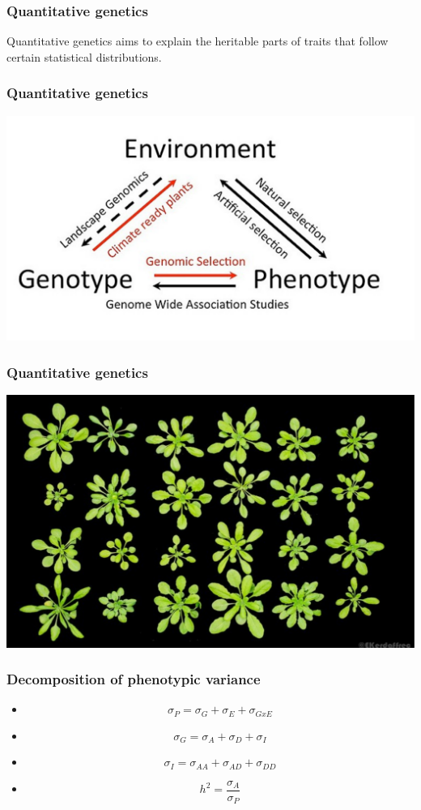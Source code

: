 \documentclass{beamer}
\title[Quantitative genetics] %
{\color{mdtRed}{Quantitative genetics from genome assemblies to neural network aided omics-based prediction of complex traits}}
\author{Jan Freudenthal}
\institute[CCTB] %
{
  CCTB \\
  Evolutionary genomics \\
  Julius-Maximilians-Universität Würzburg
}
\date{31. Jan 2020}
\begin{document}
\frame{\titlepage}

\begin{frame}
  \frametitle{Quantitative genetics}
  Quantitative genetics aims to explain the heritable parts of traits that follow certain statistical distributions.
\end{frame}


\begin{frame}
    \frametitle{Quantitative genetics}
    \includegraphics[width=.98\textwidth, height=.8\textheight]{../Figures/gxe.png}
\end{frame}

\begin{frame}
    \frametitle{Quantitative genetics}
    \includegraphics[width=.98\textwidth, height=.8\textheight]{../Figures/athal.png}
\end{frame}




\begin{frame}
  \begin{huge}
    \frametitle{Decomposition of phenotypic variance} \vspace{-2ex}
    \begin{itemize}[<+->]
    \item[] \[\sigma_P = \sigma_G + \sigma_E + \sigma_{GxE}\]
    \item[] \[\sigma_G = \sigma_A + \sigma_D + \sigma_I\]
    \item[] \[\sigma_I = \sigma_{AA} + \sigma_{AD} + \sigma_{DD}\]
    \item[] \[h^2 = \frac{\sigma_A}{\sigma_P} \]
    \end{itemize}
  \end{huge}
\end{frame}
 
\end{document}
